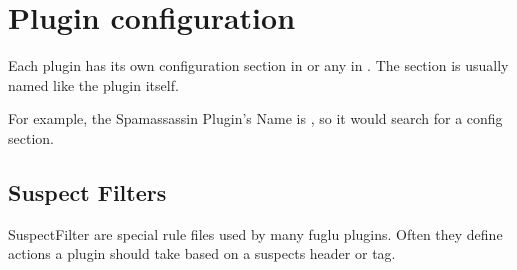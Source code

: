 \documentclass[letterpaper,10pt,english]{sphinxmanual}
\begin{document}
\section{Plugin configuration}
\label{plugins-index:plugin-configuration}
Each plugin has its own configuration section in  or any  in . The section is usually
named like the plugin itself.

For example, the Spamassassin Plugin's Name is , so it would search for a \code{{[}SAPlugin{]}} config section.


\subsection{Suspect Filters}
\label{plugins-index:suspect-filters}
SuspectFilter are special rule files used by many fuglu plugins. Often they define actions a plugin should take based on a suspects header or tag.
\end{document}
